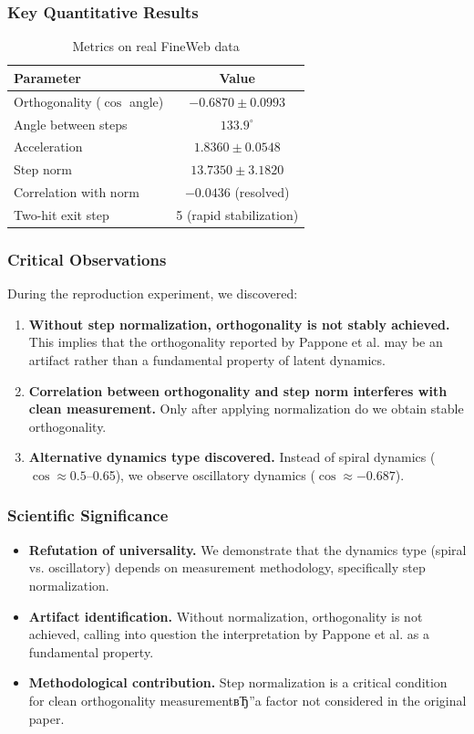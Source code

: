 \subsubsection{Key Quantitative Results}

\begin{table}[h]
\centering
\caption{Metrics on real FineWeb data}
\begin{tabular}{lc}
\toprule
Parameter & Value \\
\midrule
Orthogonality ($\cos$ angle) & $-0.6870 \pm 0.0993$ \\
Angle between steps & $133.9^\circ$ \\
Acceleration & $1.8360 \pm 0.0548$ \\
Step norm & $13.7350 \pm 3.1820$ \\
Correlation with norm & $-0.0436$ (resolved) \\
Two-hit exit step & 5 (rapid stabilization) \\
\bottomrule
\end{tabular}
\end{table}

\subsubsection{Critical Observations}

During the reproduction experiment, we discovered:

\begin{enumerate}
    \item \textbf{Without step normalization, orthogonality is not stably achieved.} This implies that the orthogonality reported by Pappone et al. may be an artifact rather than a fundamental property of latent dynamics.
    \item \textbf{Correlation between orthogonality and step norm interferes with clean measurement.} Only after applying normalization do we obtain stable orthogonality.
    \item \textbf{Alternative dynamics type discovered.} Instead of spiral dynamics ($\cos \approx 0.5$--0.65), we observe oscillatory dynamics ($\cos \approx -0.687$).
\end{enumerate}

\subsubsection{Scientific Significance}

\begin{itemize}
    \item \textbf{Refutation of universality.} We demonstrate that the dynamics type (spiral vs. oscillatory) depends on measurement methodology, specifically step normalization.
    \item \textbf{Artifact identification.} Without normalization, orthogonality is not achieved, calling into question the interpretation by Pappone et al. as a fundamental property.
    \item \textbf{Methodological contribution.} Step normalization is a critical condition for clean orthogonality measurementвЂ”a factor not considered in the original paper.
\end{itemize}

